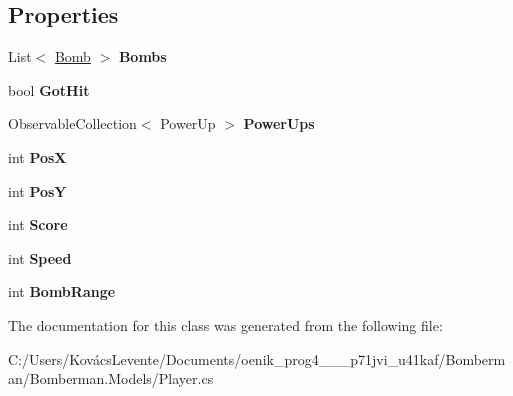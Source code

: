 \subsection*{Properties}
\begin{DoxyCompactItemize}
\item 
\mbox{\label{class_bomberman_1_1_models_1_1_player_acbbdf891a51b0c0728296a1a7f934616}} 
List$<$ \mbox{\hyperlink{class_bomberman_1_1_models_1_1_bomb}{Bomb}} $>$ {\bfseries Bombs}
\item 
\mbox{\label{class_bomberman_1_1_models_1_1_player_a866644cb4f3c3c3bc640eeffc5aacf72}} 
bool {\bfseries Got\+Hit}
\item 
\mbox{\label{class_bomberman_1_1_models_1_1_player_ae3d6ec2ecf414be4d581186ee9b70ccf}} 
Observable\+Collection$<$ Power\+Up $>$ {\bfseries Power\+Ups}
\item 
\mbox{\label{class_bomberman_1_1_models_1_1_player_a63fcb3189e656873a4769e7276f01509}} 
int {\bfseries PosX}
\item 
\mbox{\label{class_bomberman_1_1_models_1_1_player_afbb124b222afdf3ffef1a6213a7bcd78}} 
int {\bfseries PosY}
\item 
\mbox{\label{class_bomberman_1_1_models_1_1_player_a56630f9a3e2dc2f601b5aa66c51a6389}} 
int {\bfseries Score}
\item 
\mbox{\label{class_bomberman_1_1_models_1_1_player_af460b8a098fe9ae331914e65170ca439}} 
int {\bfseries Speed}
\item 
\mbox{\label{class_bomberman_1_1_models_1_1_player_af5badddbe05bc6f72617a688bbfa4eda}} 
int {\bfseries Bomb\+Range}
\end{DoxyCompactItemize}


The documentation for this class was generated from the following file\+:\begin{DoxyCompactItemize}
\item 
C\+:/\+Users/\+Kovács\+Levente/\+Documents/oenik\+\_\+prog4\+\_\+\_\+\_\+p71jvi\+\_\+u41kaf/\+Bomberman/\+Bomberman.\+Models/Player.\+cs\end{DoxyCompactItemize}
